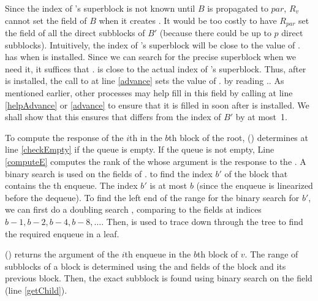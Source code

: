 Since the index of 's superblock is not known until $B$ is
propagated to $par$, $R_v$ cannot set the  field of ${B}$ when
it creates . 
It would be too costly to have $R_{par}$ set the  field of all the direct subblocks of $B'$ (because
there could be up to $p$ direct subblocks).
Intuitively, the index of 's superblock will be close to the value of . has when  is installed.
Since we can search for the precise superblock when we need it, it suffices that .
is close to the actual index of 's superblock.
Thus, after  is installed, the call to  at line \ref{advance} sets the value of . by reading ..
As mentioned earlier, other processes may help fill in this field by calling  at line \ref{helpAdvance} or \ref{advance} to ensure that it is filled in soon after  is installed.
We shall
show that this ensures that  differs
from the index of $B'$ by at most~1. 

To compute the response of the $i$th  in the $b$th block
of the root, () determines at line \ref{checkEmpty} if the queue is empty.
If the queue is
not empty, Line \ref{computeE} computes the rank  of the
 whose argument is the response to the
. 
A binary search is used on the  fields of . to find the index $b'$ of the block that contains 
the th enqueue.
The index $b'$ is at most $b$ (since the enqueue is linearized before the dequeue).  To find the left end of the range for the binary search for $b'$, we can first do a doubling search \cite{BY76}, comparing  to the  fields at indices $b-1, b-2, b-4, b-8, \ldots$.
Then,  is used to trace down through the tree to find the required enqueue in a leaf.

() returns the argument of the
$i$th enqueue in the $b$th block of  $v$. 
The range of subblocks of a block is determined using the  and
 fields of the block and its previous block. Then,
the exact subblock is found using binary search on the 
field (line \ref{getChild}). 



